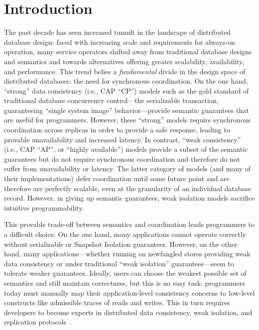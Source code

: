 
\section{Introduction}
\label{sec:intro}

The past decade has seen increased tumult in the landscape of
distributed database design: faced with increasing scale and
requirements for always-on operation, many service operators shifted
away from traditional database designs and semantics and towards
alternatives offering greater scalability, availability, and
performance. This trend belies a \textit{fundamental} divide in the
design space of distributed databases: the need for synchronous
coordination. On the one hand, ``strong'' data consistency (i.e., CAP
``CP'') models such as the gold standard of traditional database
concurrency control---the serializable transaction, guaranteeing
``single system image'' behavior---provide semantic guarantees that
are useful for programmers. However, these ``strong'' models require
synchronous coordination across replicas in order to provide a safe
response, leading to provable unavailability and increased latency. In
contrast, ``weak consistency'' (i.e., CAP ``AP'', or ``highly
available'') models provide a subset of the semantic guarantees but do
not require synchronous coordination and therefore do not suffer from
unavailability or latency. The latter category of models (and many of
their implementations) defer coordination until some future point and
are therefore are perfectly scalable, even at the granularity of an
individual database record. However, in giving up semantic guarantees,
weak isolation models sacrifice intuitive programmability.

This provable trade-off between semantics and coordination leads
programmers to a difficult choice. On the one hand, many applications
cannot operate correctly without serializable or Snapshot Isolation
guarantees. However, on the other hand, many applications---whether
running on newfangled stores providing weak data consistency or under
traditional ``weak isolation'' guarantees---seem to tolerate weaker
guarantees. Ideally, users can choose the weakest possible set of
semantics and still maintain correctness, but this is no easy task:
programmers today must manually map their application-level
consistency concerns to low-level constructs like admissible traces of
reads and writes. This in turn requires developers to become experts
in distributed data consistency, weak isolation, and replication
protocols~\cite{consistency-borders}.

